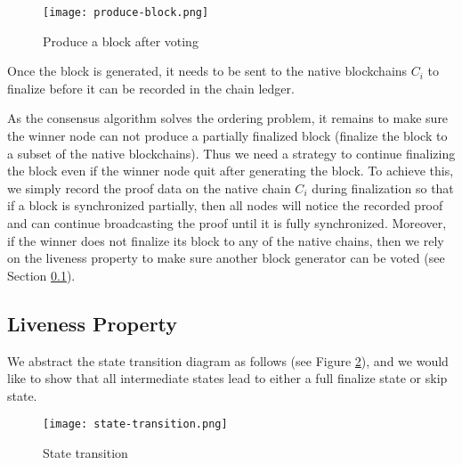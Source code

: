 \begin{figure}[!ht]
\begin{center}
\texttt{[image: produce-block.png]}
\end{center}
\caption{Produce a block after voting}
\label{produce-block}
\end{figure}

Once the block is generated, it needs to be sent to the native blockchains $C_i$ to finalize before it can be recorded in the \dprotocol chain ledger. 

As the consensus algorithm solves the ordering problem, it remains to make sure the winner node can not produce a partially finalized block (finalize the block to a subset of the native blockchains). Thus we need a strategy to continue finalizing the block even if the winner node quit after generating the block. To achieve this, we simply record the proof data on the native chain $C_i$ during finalization so that if a block is synchronized partially, then all \dprotocol nodes will notice the recorded proof and can continue broadcasting the proof until it is fully synchronized. Moreover, if the winner does not finalize its block to any of the native chains, then we rely on the liveness property to make sure another block generator can be voted (see Section \ref{chp:sub:liveness}).

\subsection{Liveness Property}
\label{chp:sub:liveness}
We abstract the state transition diagram as follows (see Figure \ref{state-transition}), and we would like to show that all intermediate states lead to either a full finalize state or skip state.
\begin{figure}[!ht]
\begin{center}
\texttt{[image: state-transition.png]}
\end{center}
\caption{State transition}
\label{state-transition}
\end{figure}


